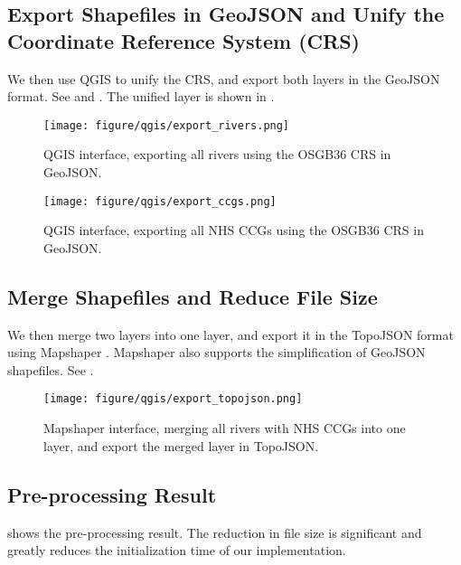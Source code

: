 \subsection{Export Shapefiles in GeoJSON and Unify the Coordinate Reference System (CRS)}

We then use QGIS to unify the CRS, and export both layers in the GeoJSON format. See  and . The unified layer is shown in .

{
\begin{figure}[H]
    \centering
    \texttt{[image: figure/qgis/export\_rivers.png]}
    \caption{QGIS interface, exporting all rivers using the OSGB36 CRS in GeoJSON.}
    \label{fig:export_rivers}
\end{figure}

\begin{figure}[H]
    \centering
    \texttt{[image: figure/qgis/export\_ccgs.png]}
    \caption{QGIS interface, exporting all NHS CCGs using the OSGB36 CRS in GeoJSON.}
    \label{fig:export_ccgs}
\end{figure}

}

\subsection{Merge Shapefiles and Reduce File Size}

We then merge two layers into one layer, and export it in the TopoJSON format using Mapshaper \cite{blochMapshaper}. Mapshaper also supports the simplification of GeoJSON shapefiles. See .

{
\begin{figure}[H]
    \centering
    \texttt{[image: figure/qgis/export\_topojson.png]}
    \caption{Mapshaper interface, merging all rivers with NHS CCGs into one layer, and export the merged layer in TopoJSON.}
    \label{fig:export_topojson}
\end{figure}
}

\subsection{Pre-processing Result}

 shows the pre-processing result. The reduction in file size is significant and greatly reduces the initialization time of our implementation.

